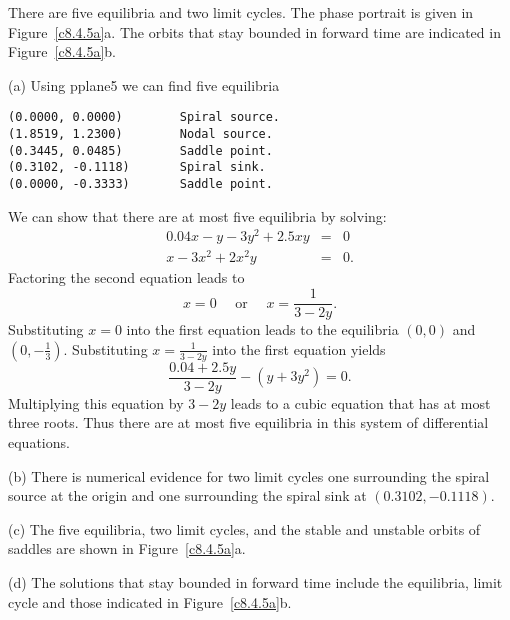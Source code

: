 \documentclass{ximera}
\begin{document}
\begin{figure}[htb]
                       \centerline{%
                       }
\end{figure}

\ans There are five equilibria and two limit cycles.  The phase portrait is
given in Figure~\ref{c8.4.5a}a.  The orbits that stay bounded in
forward time are indicated in Figure~\ref{c8.4.5a}b.

\soln (a)  Using {\sf pplane5} we can find five equilibria
\begin{verbatim}
(0.0000, 0.0000)        Spiral source.           
(1.8519, 1.2300)        Nodal source.            
(0.3445, 0.0485)        Saddle point.            
(0.3102, -0.1118)       Spiral sink.             
(0.0000, -0.3333)       Saddle point.            
\end{verbatim}
We can show that there are at most five equilibria by solving:
\begin{eqnarray*}
0.04x - y - 3y^2 + 2.5xy & = & 0\\
x - 3x^2 + 2x^2y & = & 0.
\end{eqnarray*}  
Factoring the second equation leads to 
\[
x=0 \quad \mbox{ or } \quad x = \frac{1}{3-2y}.
\]
Substituting $x=0$ into the first equation leads to the equilibria
$(0,0)$ and $(0,-\frac{1}{3})$. Substituting $x = \frac{1}{3-2y}$ into the
first equation yields
\[
\frac{0.04+2.5y}{3-2y} -(y+3y^2)=0.
\]
Multiplying this equation by $3-2y$ leads to a cubic equation that has at most
three roots.  Thus there are at most five equilibria in this system of
differential equations.

\noindent (b) There is numerical evidence for two limit cycles
one surrounding the spiral source at the origin and one surrounding the
spiral sink at $(0.3102, -0.1118)$.

\noindent (c)  The five equilibria, two limit cycles, and the stable and
unstable orbits of saddles are shown in Figure~\ref{c8.4.5a}a.

\noindent (d)  The solutions that stay bounded in forward time include the
equilibria, limit cycle and those indicated in Figure~\ref{c8.4.5a}b.

\begin{figure}[htb]
                       \centerline{%
			}
\end{figure}
\end{document}
